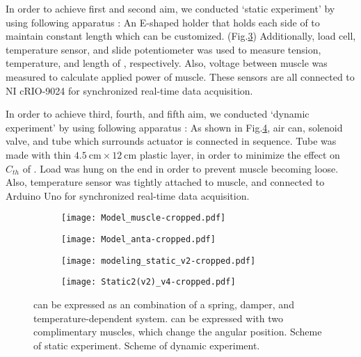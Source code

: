 In order to achieve first and second aim, we conducted `static experiment' by using following apparatus : An E-shaped holder that holds each side of \scp to maintain constant length which can be customized. (Fig.\ref{static_sch}) Additionally, load cell, temperature sensor, and slide potentiometer was used to measure tension, temperature, and length of \scpnospace, respectively. Also, voltage between muscle was measured to calculate applied power of muscle. These sensors are all connected to NI cRIO-9024 for synchronized real-time data acquisition.

In order to achieve third, fourth, and fifth aim, we conducted `dynamic experiment' by using following apparatus : As shown in Fig.\ref{dynamic_sch}, air can, solenoid valve, and tube which surrounds actuator is connected in sequence. 
Tube was made with thin $\SI{4.5}{\centi\meter} \times \SI{12}{\centi\meter}$ plastic layer, in order to minimize the effect on $C_{th}$ of \scpnospace.
Load was hung on the end in order to prevent muscle becoming loose. 
Also, temperature sensor was tightly attached to muscle, and connected to Arduino Uno for synchronized real-time data acquisition.



\begin{figure}[t]
	\centering
	\begin{subfigure}[t]{0.2\textwidth}
		\centering\texttt{[image: Model\_muscle-cropped.pdf]}
		\caption{\label{ModelMus}}
	\end{subfigure}
	\begin{subfigure}[t]{0.31\textwidth}
		\centering\texttt{[image: Model\_anta-cropped.pdf]}
		\caption{\label{ModelAnt}}
	\end{subfigure}
	\begin{subfigure}[t]{0.22\textwidth}
		\centering\texttt{[image: modeling\_static\_v2-cropped.pdf]}
		\caption{\label{static_sch}}
	\end{subfigure}
	\begin{subfigure}[t]{0.22\textwidth}
		\centering\texttt{[image: Static2(v2)\_v4-cropped.pdf]} %
		\caption{\label{dynamic_sch}}
	\end{subfigure}
	\caption[Modeling of \scp]{ \scp can be expressed as an combination of a spring, damper, and temperature-dependent system.  \Anta can be expressed with two complimentary muscles, which change the angular position.  Scheme of static experiment.  Scheme of dynamic experiment.}
	\label{model+exp_sch}
\end{figure}


